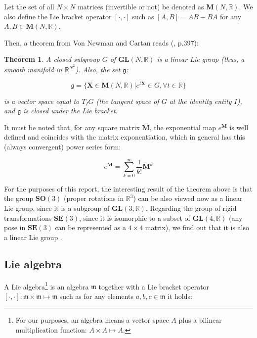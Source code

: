 \documentclass[a4paper,11pt]{report}
\newtheorem{mytheorem}{Theorem}
\begin{document}
Let the set of all $N \times N$ matrices (invertible or not)
be denoted as $\mathbf{M}(N,\mathbb{R})$.
We also define the Lie bracket operator $[\cdot,\cdot]$ such as
$[A,B]=AB-BA$ for any $A,B \in \mathbf{M}(N,\mathbb{R})$.

Then, a theorem from Von Newman and Cartan reads (\cite{gallier2001geometric}, p.397):

\begin{mytheorem}
A closed subgroup $G$ of $\mathbf{GL}(N,\mathbb{R})$
is a linear Lie group (thus, a smooth manifold in $\mathbb{R}^{N^2}$).
Also, the set $\mathfrak{g}$:

\begin{equation}
  \mathfrak{g} = \{ \mathbf{X} \in \mathbf{M}(N,\mathbb{R}) | e^{t\mathbf{X}} \in G,  \forall t \in \mathbb{R}  \}
\end{equation}

\noindent is a vector space equal to $T_I G$ (the tangent space of $G$
at the identity entity $I$), and $\mathfrak{g}$ is closed under the Lie bracket.
\end{mytheorem}

It must be noted that, for any square matrix $\mathbf{M}$,
the exponential map $e^{\mathbf{M}}$ is well defined and coincides with the matrix
exponentiation, which in general has this (always convergent) power series form:

\begin{equation}
\label{eq:exp_map_matrices}
e^{\mathbf{M}} = \sum_{k=0}^\infty \frac{1}{k!} \mathbf{M}^k
\end{equation}


For the purposes of this report, the interesting result of the theorem
above is that the group $\mathbf{SO}(3)$ (proper rotations in $\mathbb{R}^3$)
can be also viewed now as a linear Lie group, since it is a
subgroup of $\mathbf{GL}(3,\mathbb{R})$.
Regarding the group of rigid transformations $\mathbf{SE}(3)$,
since it is isomorphic to a subset of $\mathbf{GL}(4,\mathbb{R})$
(any pose in $\mathbf{SE}(3)$ can be represented as a $4\times 4$ matrix),
we find out that it is also a linear Lie group \cite{gallier2001geometric}.


\subsection{Lie algebra}

A Lie algebra\footnote{For our purposes, an algebra means a vector space $A$ plus
a bilinear multiplication function: $A \times A \mapsto A$.}
is an algebra $\mathfrak{m}$ together with a Lie bracket operator
$[\cdot,\cdot]: \mathfrak{m} \times \mathfrak{m} \mapsto \mathfrak{m}$
such as for any elements $a,b,c \in \mathfrak{m}$
it holds:
\end{document}
